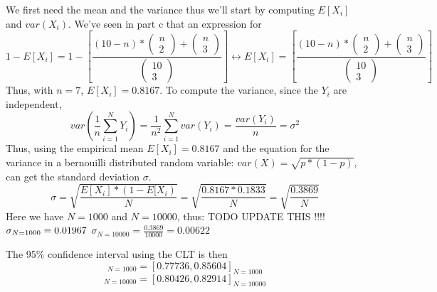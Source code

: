 \documentclass{article}
\begin{document}
We first need the mean and the variance thus we'll start by computing
$E[X_{i}]$ and $var(X_{i})$. We've seen in part c that an expression for
\begin{equation*}
    1 - E[X_{i}] = 1 - [ \frac{(10 - n) * \begin{pmatrix} n \\ 2 \end{pmatrix} + \begin{pmatrix} n \\ 3 \end{pmatrix}}{\begin{pmatrix} 10 \\ 3 \end{pmatrix}}]
    \leftrightarrow
    E[X_{i}] = [ \frac{(10 - n) * \begin{pmatrix} n \\ 2 \end{pmatrix} + \begin{pmatrix} n \\ 3 \end{pmatrix}}{\begin{pmatrix} 10 \\ 3 \end{pmatrix}}]
\end{equation*}
Thus, with $ n = 7$, $ E[X_{i}] = 0.8167 $.
To compute the variance, since the $ Y_{i} $ are independent,
\begin{equation}
    var(\frac{1}{n} \sum_{i=1}^N Y_{i}) = \frac{1}{n^2} \sum_{i=1}^N var(Y_{i}) = \frac{var(Y_{i})}{n} = \sigma^2
\end{equation}
Thus, using the empirical mean $ E[X_{i}] = 0.8167 $ and the equation for the variance in a bernouilli distributed
random variable: $ var(X) = \sqrt{p * (1 - p)} $, can get the standard deviation $\sigma$.
\begin{equation}
    \sigma = \sqrt{\frac{E[X_{i}] * (1 - E[X_{i})}{N}} = \sqrt{\frac{0.8167 * 0.1833‬}{N}} = \sqrt{\frac{0.3869}{N}}
\end{equation}
Here we have $N = 1000$ and $N = 10000$, thus:
TODO UPDATE THIS !!!!
$\sigma_{N=1000} = 0.01967 \\$
$\sigma_{N=10000} = \frac{0.3869}{10000} = 0.00622$

The 95\% confidence interval using the CLT is then
\begin{equation}
    [\mu − 2\sigma, \mu +2\sigma]_{N=1000} = [0.77736‬, 0.85604]_{N=1000}
\end{equation}
\begin{equation}
    [\mu − 2\sigma, \mu +2\sigma]_{N=10000} = [0.80426, 0.82914]_{N=10000}
\end{equation}
\end{document}
